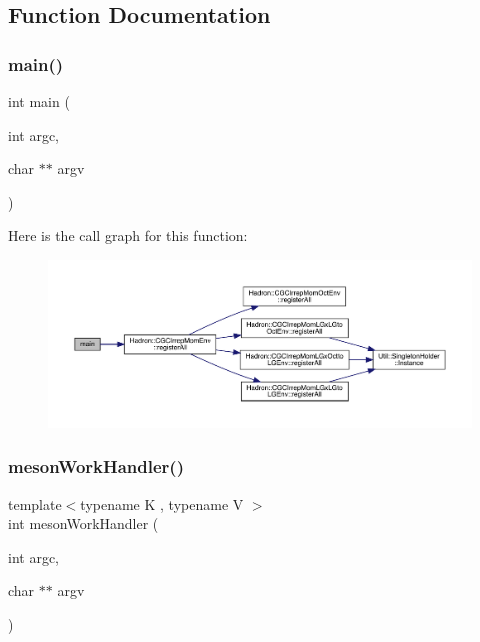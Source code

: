 \subsection{Function Documentation}
\mbox{\label{adat-devel_2main_2dbutil_2dbutil_8cc_a3c04138a5bfe5d72780bb7e82a18e627}} 
\subsubsection{\texorpdfstring{main()}{main()}}
{\footnotesize\ttfamily int main (\begin{DoxyParamCaption}\item[{int}]{argc,  }\item[{char $\ast$$\ast$}]{argv }\end{DoxyParamCaption})}

Here is the call graph for this function\+:
\nopagebreak
\begin{figure}[H]
\begin{center}
\leavevmode
\includegraphics[width=350pt]{d5/d55/adat-devel_2main_2dbutil_2dbutil_8cc_a3c04138a5bfe5d72780bb7e82a18e627_cgraph}
\end{center}
\end{figure}
\mbox{\label{adat-devel_2main_2dbutil_2dbutil_8cc_af8b76d6df0ac8bee6ad6ed5d144b2835}} 
\subsubsection{\texorpdfstring{mesonWorkHandler()}{mesonWorkHandler()}}
{\footnotesize\ttfamily template$<$typename K , typename V $>$ \\
int meson\+Work\+Handler (\begin{DoxyParamCaption}\item[{int}]{argc,  }\item[{char $\ast$$\ast$}]{argv }\end{DoxyParamCaption})}




